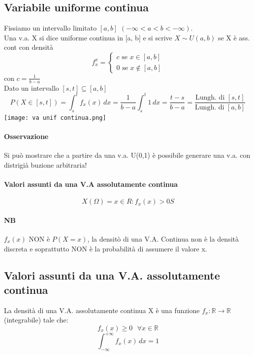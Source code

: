 \documentclass[12pt, a4paper, openany]{book}
\begin{document}
\subsection{Variabile uniforme continua}
Fissiamo un intervallo limitato $[a, b]$ $(-\infty < a < b < -\infty)$.
\\ Una v.a. X si dice uniforme continua in [a, b] e si scrive $X \sim U(a, b)$
se X è ass. cont con densità
\begin{equation*}
    f_x^{x} =
    \begin{cases}
        c \text{ se } x \in [a, b]\\
        0 \text{ se } x \notin [a, b]
    \end{cases} 
\end{equation*}
con $c = \frac{1}{b-a}$
\\ Dato un intervallo $[s, t] \subseteq [a, b]$
\begin{equation*}
    P(X \in [s,t]) = \int_s^t f_x (x) \,dx = 
    \frac{1}{b -a} \int_s^t 1 \,dx = \frac{t-s}{b-a} =
    \frac{\text{Lungh. di } [s,t]}{\text{Lungh. di } [a, b]}
\end{equation*} 
\texttt{[image: va unif continua.png]}
\paragraph*{Osservazione} Si può mostrare che a partire da una v.a. U(0,1) è possibile
generare una v.a. con distrigià buzione arbitraria!

\paragraph*{Valori assunti da una V.A assolutamente continua}
\begin{equation*}
    X(\Omega) = {x \in R: f_x(x) > 0S}
\end{equation*}

\paragraph{NB} $f_x(x)$ NON è $P(X=x)$, la densitò di una V.A. Continua non è la densità discreta 
e soprattutto NON è la probabilità di assumere il valore x.

\subsection{Valori assunti da una V.A. assolutamente continua}
La densità di una V.A. assolutamente continua X è una funzione $f_x:\mathbb{R} \rightarrow \mathbb{R}$ (integrabile)
tale che:
\begin{equation*}
    f_x(x) \geq 0 \textrm{ } \forall x \in  \mathbb{R}
\end{equation*}
\begin{equation*}
    \int_{-\infty}^{+\infty} f_x(x)  \,dx = 1
\end{equation*}
\end{document}
